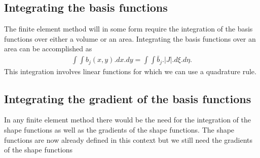 \documentclass[11pt,letterpaper,titlepage]{article}
\numberwithin{equation}{section}
\begin{document}
\subsection{Integrating the basis functions}
The finite element method will in some form require the integration of the basis functions over either a volume or an area. Integrating the basis functions over an area can be accomplished as 
\begin{align*}
\int \int b_j(x,y).dx.dy = \int \int \bar{b}_j .|J|.d\xi.d\eta.
\end{align*}
This integration involves linear functions for which we can use a quadrature rule.

\subsection{Integrating the gradient of the basis functions}


In any finite element method there would be the need for the integration of the shape functions as well as the gradients of the shape functions. The shape functions are now already defined in this context but we still need the gradients of the shape functions
\end{document}

